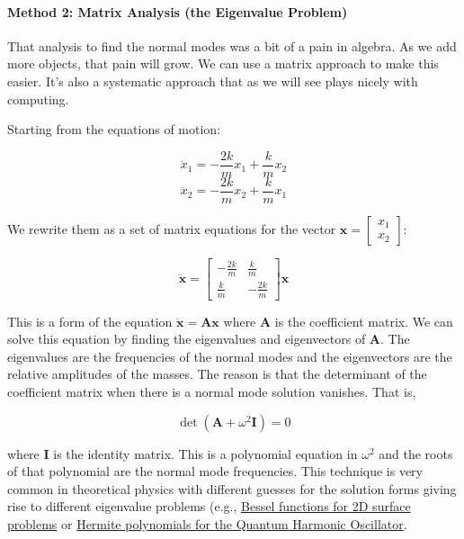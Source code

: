 \begin{Shaded}
\begin{Highlighting}[]
\end{Highlighting}
\end{Shaded}

\paragraph{Method 2: Matrix Analysis (the Eigenvalue
Problem)}\label{method-2-matrix-analysis-the-eigenvalue-problem}

That analysis to find the normal modes was a bit of a pain in algebra.
As we add more objects, that pain will grow. We can use a matrix
approach to make this easier. It's also a systematic approach that as we
will see plays nicely with computing.

Starting from the equations of motion:

\[\ddot{x}_1 = -\frac{2k}{m}x_1 + \frac{k}{m}x_2\]
\[\ddot{x}_2 = -\frac{2k}{m}x_2 + \frac{k}{m}x_1\]

We rewrite them as a set of matrix equations for the vector
\(\mathbf{x} = \begin{bmatrix}x_1\\x_2\end{bmatrix}\):

\[\ddot{\mathbf{x}} = \begin{bmatrix}-\frac{2k}{m} & \frac{k}{m}\\\frac{k}{m} & -\frac{2k}{m}\end{bmatrix}\mathbf{x}\]

This is a form of the equation
\(\ddot{\mathbf{x}} = \pmb{A} \mathbf{x}\) where \(\pmb{A}\) is the
coefficient matrix. We can solve this equation by finding the
eigenvalues and eigenvectors of \(\pmb{A}\). The eigenvalues are the
frequencies of the normal modes and the eigenvectors are the relative
amplitudes of the masses. The reason is that the determinant of the
coefficient matrix when there is a normal mode solution vanishes. That
is,

\[\det(\pmb{A}+\omega^2\pmb{I}) = 0\]

where \(\pmb{I}\) is the identity matrix. This is a polynomial equation
in \(\omega^2\) and the roots of that polynomial are the normal mode
frequencies. This technique is very common in theoretical physics with
different guesses for the solution forms giving rise to different
eigenvalue problems (e.g.,
\href{https://en.wikipedia.org/wiki/Bessel_function}{Bessel functions
for 2D surface problems} or
\href{https://en.wikipedia.org/wiki/Hermite_polynomials}{Hermite
polynomials for the Quantum Harmonic Oscillator}.

